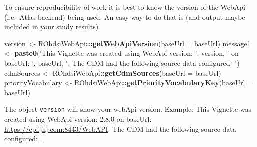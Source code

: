 \documentclass[
]{article}
\newenvironment{Shaded}{\begin{snugshade}}{\end{snugshade}}
\newcommand{\DataTypeTok}[1]{\textcolor[rgb]{0.13,0.29,0.53}{#1}}
\newcommand{\KeywordTok}[1]{\textcolor[rgb]{0.13,0.29,0.53}{\textbf{#1}}}
\newcommand{\NormalTok}[1]{#1}
\newcommand{\OperatorTok}[1]{\textcolor[rgb]{0.81,0.36,0.00}{\textbf{#1}}}
\newcommand{\StringTok}[1]{\textcolor[rgb]{0.31,0.60,0.02}{#1}}
\begin{document}
To ensure reproducibility of work it is best to know the version of the
WebApi (i.e.~Atlas backend) being used. An easy way to do that is (and
output maybe included in your study results)

\begin{Shaded}
\begin{Highlighting}[]

\NormalTok{version <-}\StringTok{ }\NormalTok{ROhdsiWebApi}\OperatorTok{:::}\KeywordTok{getWebApiVersion}\NormalTok{(}\DataTypeTok{baseUrl =}\NormalTok{ baseUrl)}
\NormalTok{message1 <-}\StringTok{ }\KeywordTok{paste0}\NormalTok{(}\StringTok{'This Vignette was created using WebApi version: '}\NormalTok{, }
\NormalTok{                   version, }
                   \StringTok{' on baseUrl: '}\NormalTok{, }
\NormalTok{                   baseUrl, }
                   \StringTok{". The CDM had the following source data configured: "}\NormalTok{)}
\NormalTok{cdmSources <-}\StringTok{ }\NormalTok{ROhdsiWebApi}\OperatorTok{::}\KeywordTok{getCdmSources}\NormalTok{(}\DataTypeTok{baseUrl =}\NormalTok{ baseUrl)}
\NormalTok{priorityVocabulary <-}\StringTok{ }\NormalTok{ROhdsiWebApi}\OperatorTok{::}\KeywordTok{getPriorityVocabularyKey}\NormalTok{(}\DataTypeTok{baseUrl =}\NormalTok{ baseUrl)}
\end{Highlighting}
\end{Shaded}

The object \texttt{version} will show your webApi version. Example: This
Vignette was created using WebApi version: 2.8.0 on baseUrl:
\url{https://epi.jnj.com:8443/WebAPI}. The CDM had the following source
data configured: .
\end{document}
